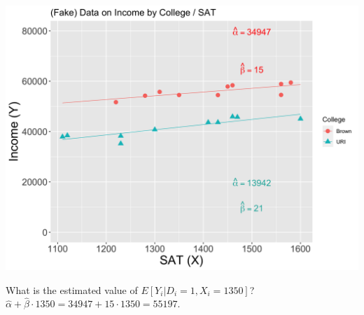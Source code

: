 \documentclass[11pt,english,handout]{beamer}
\newenvironment{wideitemize}{\itemize\addtolength{\itemsep}{10pt}}{\enditemize}
\begin{document}
\begin{frame}
	\centering
	\includegraphics[width =.9\linewidth]{fake-sat-with-trend-both-betas.png}
	
	\pause
	\begin{wideitemize}
		\item
		What is the estimated value of $E[Y_i | D_i = 1, X_i = 1350]$? \pause $\hat\alpha + \hat\beta \cdot 1350 = 34947 + 15 \cdot 1350 = 55197$. 
	\end{wideitemize}
\end{frame}


%
\end{document}
